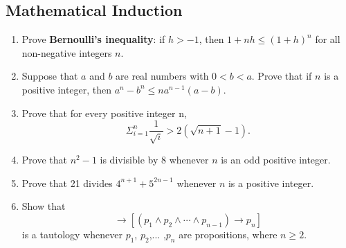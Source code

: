 \documentclass{../../cls/sig-alternate-05-2015}
\begin{document}
\subsection{Mathematical Induction}
\begin{enumerate}
\item Prove \textbf{Bernoulli\textquoteright s inequality}: if $h > -1$, then $1+nh \le (1+h)^n$ for all non-negative integers $n$.

\item Suppose that $a$ and $b$ are real numbers with $0 < b < a$.
Prove that if $n$ is a positive integer, then $a^n - b^n \le na^{n - 1}(a - b)$.

\item Prove that for every positive integer n, \begin{equation}
	\Sigma_{i = 1}^n \frac{1}{\sqrt{i}} > 2(\sqrt{n + 1} - 1).
\end{equation}

\item Prove that $n^2 - 1$ is divisible by 8 whenever $n$ is an odd positive integer.

\item Prove that 21 divides $4^{n + 1} + 5^{2n - 1}$ whenever $n$ is a positive integer.

\item Show that \begin{equation}
	[(p_1 \rightarrow p_2) \wedge (p_2 \rightarrow p_3) \wedge \cdots \wedge (p_{n - 1} \rightarrow p_n)] \rightarrow [(p_1 \wedge p_2 \wedge \cdots \wedge p_{n - 1}) \rightarrow p_n]
\end{equation}
is a tautology whenever $p_1$, $p_2$,... ,$p_n$ are propositions, where $n \ge 2$.
\end{enumerate}
\end{document}

